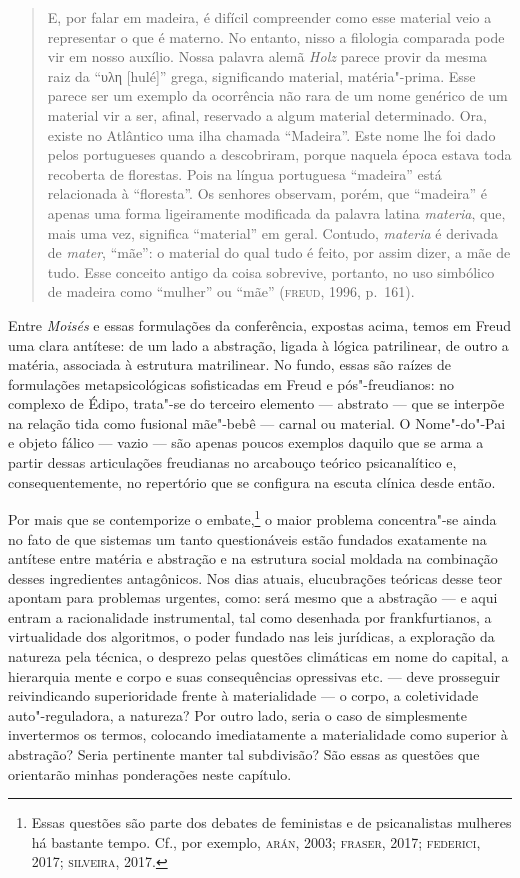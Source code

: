 \begin{quote}
E, por falar em madeira, é difícil compreender como esse material veio a
representar o que é materno. No entanto, nisso a filologia comparada
pode vir em nosso auxílio. Nossa palavra alemã \emph{Holz} parece provir
da mesma raiz da ``υλη {[}hulé{]}'' grega, significando material,
matéria"-prima. Esse parece ser um exemplo da ocorrência não rara de um
nome genérico de um material vir a ser, afinal, reservado a algum
material determinado. Ora, existe no Atlântico uma ilha chamada
``Madeira''. Este nome lhe foi dado pelos portugueses quando a
descobriram, porque naquela época estava toda recoberta de florestas.
Pois na língua portuguesa ``madeira'' está relacionada à ``floresta''.
Os senhores observam, porém, que ``madeira'' é apenas uma forma
ligeiramente modificada da palavra latina \emph{materia}, que, mais uma
vez, significa ``material'' em geral. Contudo, \emph{materia} é derivada
de \emph{mater}, ``mãe'': o material do qual tudo é feito, por assim
dizer, a mãe de tudo. Esse conceito antigo da coisa sobrevive, portanto,
no uso simbólico de madeira como ``mulher'' ou ``mãe'' (\textsc{freud},
1996, p.~161).
\end{quote}

Entre \emph{Moisés} e essas formulações da conferência, expostas acima,
temos em Freud uma clara antítese: de um lado a abstração, ligada à
lógica patrilinear, de outro a matéria, associada à estrutura
matrilinear. No fundo, essas são raízes de formulações metapsicológicas
sofisticadas em Freud e pós"-freudianos: no complexo de Édipo, trata"-se
do terceiro elemento --- abstrato --- que se interpõe na relação tida como
fusional mãe"-bebê --- carnal ou material. O Nome"-do"-Pai e objeto fálico
--- vazio --- são apenas poucos exemplos daquilo que se arma a partir
dessas articulações freudianas no arcabouço teórico psicanalítico e,
consequentemente, no repertório que se configura na escuta clínica desde
então.

Por mais que se contemporize o embate,\footnote{Essas questões são parte
  dos debates de feministas e de psicanalistas mulheres há bastante
  tempo. Cf., por exemplo, \textsc{arán}, 2003; \textsc{fraser}, 2017;
  \textsc{federici}, 2017; \textsc{silveira}, 2017.} o maior problema
concentra"-se ainda no fato de que sistemas um tanto questionáveis estão
fundados exatamente na antítese entre matéria e abstração e na estrutura
social moldada na combinação desses ingredientes antagônicos. Nos dias
atuais, elucubrações teóricas desse teor apontam para problemas
urgentes, como: será mesmo que a abstração --- e aqui entram a
racionalidade instrumental, tal como desenhada por frankfurtianos, a
virtualidade dos algoritmos, o poder fundado nas leis jurídicas, a
exploração da natureza pela técnica, o desprezo pelas questões
climáticas em nome do capital, a hierarquia mente e corpo e suas
consequências opressivas etc. --- deve prosseguir reivindicando
superioridade frente à materialidade --- o corpo, a coletividade
auto"-reguladora, a natureza? Por outro lado, seria o caso de
simplesmente invertermos os termos, colocando imediatamente a
materialidade como superior à abstração? Seria pertinente manter tal
subdivisão? São essas as questões que orientarão minhas ponderações
neste capítulo.

